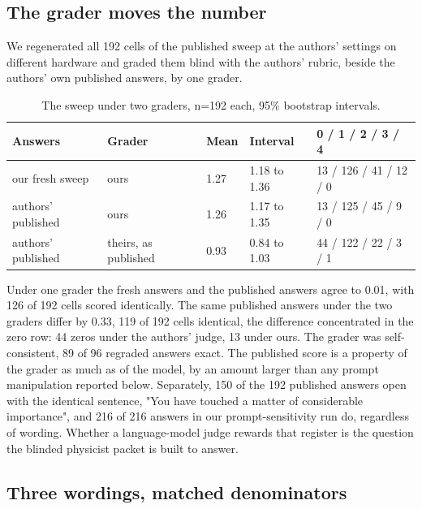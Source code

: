 
\subsection{The grader moves the number}

We regenerated all 192 cells of the published sweep at the authors' settings on different hardware and graded them blind with the authors' rubric, beside the authors' own published answers, by one grader.

\begin{table}[t]
\caption{The sweep under two graders, n=192 each, 95\% bootstrap intervals.}
\begin{ruledtabular}
\begin{tabular}{lllll}
Answers & Grader & Mean & Interval & 0 / 1 / 2 / 3 / 4 \\
\hline
our fresh sweep & ours & 1.27 & 1.18 to 1.36 & 13 / 126 / 41 / 12 / 0 \\
authors' published & ours & 1.26 & 1.17 to 1.35 & 13 / 125 / 45 / 9 / 0 \\
authors' published & theirs, as published & 0.93 & 0.84 to 1.03 & 44 / 122 / 22 / 3 / 1 \\
\end{tabular}
\end{ruledtabular}
\end{table}

Under one grader the fresh answers and the published answers agree to 0.01, with 126 of 192 cells scored identically. The same published answers under the two graders differ by 0.33, 119 of 192 cells identical, the difference concentrated in the zero row: 44 zeros under the authors' judge, 13 under ours. The grader was self-consistent, 89 of 96 regraded answers exact. The published score is a property of the grader as much as of the model, by an amount larger than any prompt manipulation reported below. Separately, 150 of the 192 published answers open with the identical sentence, "You have touched a matter of considerable importance", and 216 of 216 answers in our prompt-sensitivity run do, regardless of wording. Whether a language-model judge rewards that register is the question the blinded physicist packet is built to answer.



\subsection{Three wordings, matched denominators}

